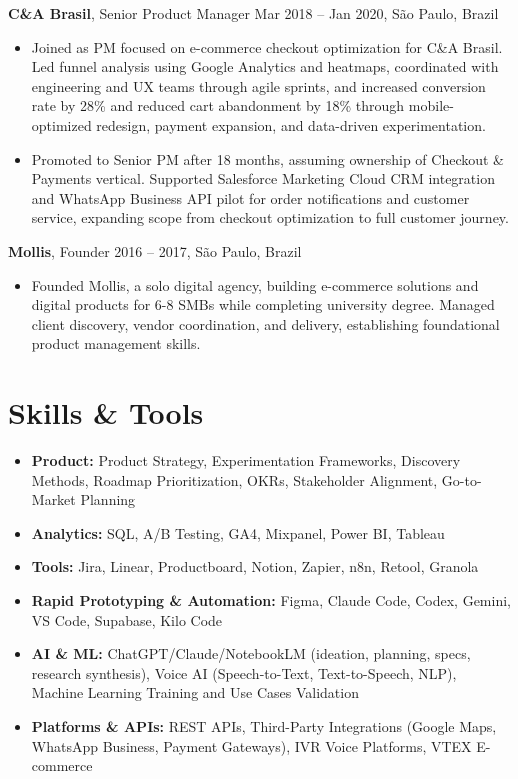 \documentclass[11pt,a4paper]{article}
\begin{document}
\vspace{6pt}

\noindent\textbf{C\&A Brasil}, Senior Product Manager \hfill Mar 2018 – Jan 2020, São Paulo, Brazil
\begin{itemize}[leftmargin=*, label=$\bullet$, itemsep=5pt, parsep=0pt]
\item Joined as PM focused on e-commerce checkout optimization for C\&A Brasil. Led funnel analysis using Google Analytics and heatmaps, coordinated with engineering and UX teams through agile sprints, and increased conversion rate by 28\% and reduced cart abandonment by 18\% through mobile-optimized redesign, payment expansion, and data-driven experimentation.

\item Promoted to Senior PM after 18 months, assuming ownership of Checkout \& Payments vertical. Supported Salesforce Marketing Cloud CRM integration and WhatsApp Business API pilot for order notifications and customer service, expanding scope from checkout optimization to full customer journey.
\end{itemize}

\vspace{8pt}

\noindent\textbf{Mollis}, Founder \hfill 2016 – 2017, São Paulo, Brazil
\begin{itemize}[leftmargin=*, label=$\bullet$, itemsep=5pt, parsep=0pt]
\item Founded Mollis, a solo digital agency, building e-commerce solutions and digital products for 6-8 SMBs while completing university degree. Managed client discovery, vendor coordination, and delivery, establishing foundational product management skills.
\end{itemize}

\vspace{6pt}

\section*{Skills \& Tools}
\begin{itemize}[leftmargin=*, label=$\bullet$, itemsep=3pt, parsep=0pt]
\item \textbf{Product:} Product Strategy, Experimentation Frameworks, Discovery Methods, Roadmap Prioritization, OKRs, Stakeholder Alignment, Go-to-Market Planning
\item \textbf{Analytics:} SQL, A/B Testing, GA4, Mixpanel, Power BI, Tableau
\item \textbf{Tools:} Jira, Linear, Productboard, Notion, Zapier, n8n, Retool, Granola
\item \textbf{Rapid Prototyping \& Automation:} Figma, Claude Code, Codex, Gemini, VS Code, Supabase, Kilo Code
\item \textbf{AI \& ML:} ChatGPT/Claude/NotebookLM (ideation, planning, specs, research synthesis), Voice AI (Speech-to-Text, Text-to-Speech, NLP), Machine Learning Training and Use Cases Validation
\item \textbf{Platforms \& APIs:} REST APIs, Third-Party Integrations (Google Maps, WhatsApp Business, Payment Gateways), IVR Voice Platforms, VTEX E-commerce
\end{itemize}
\end{document}
